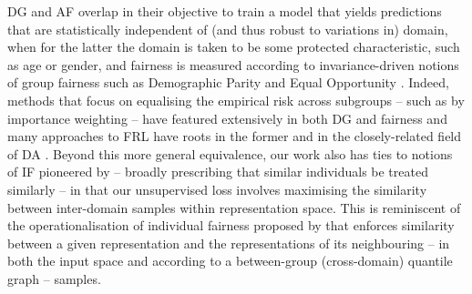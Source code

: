 \ac{DG} and \ac{AF} overlap in their objective to train a model that yields predictions that are
statistically independent of (and thus robust to variations in) domain, when for the latter the
domain is taken to be some protected characteristic, such as age or gender, and fairness is
measured according to invariance-driven notions of group fairness such as Demographic Parity
\citep{feldman2015certifying} and Equal Opportunity \citep{hardt2016equality}. 
%
Indeed, methods that focus on equalising the empirical risk across subgroups -- such as by
importance weighting \citep{idrissi2022simple, shimodaira2000improving} -- have featured
extensively in both \ac{DG}
\citep{arjovsky2019invariant,creager2021environment,krueger2021out,sagawa2019distributionally} and
fairness \citep{agarwal2018reductions,donini2018empirical,kamiran2012data} and many approaches to
\ac{FRL} \citep{creager2019flexibly,kehrenberg2020null,madras2018learning,
oneto2020exploiting,quadrianto2019discovering} have roots in the former \citep{muandet2013domain}
and in the closely-related field of \ac{DA} \citep{ganin2016domain}. 
%
Beyond this more general equivalence, our work also has ties to notions of \ac{IF} pioneered by
\citet{dwork2012fairness} -- broadly prescribing that similar individuals be treated similarly --
in that our unsupervised loss involves maximising the similarity between inter-domain samples
within representation space. 
%
This is reminiscent of the operationalisation of individual fairness proposed by
\citet{lahoti2019operationalizing} that enforces similarity between a given representation and the
representations of its neighbouring -- in both the input space and according to a between-group
(cross-domain) quantile graph -- samples.
